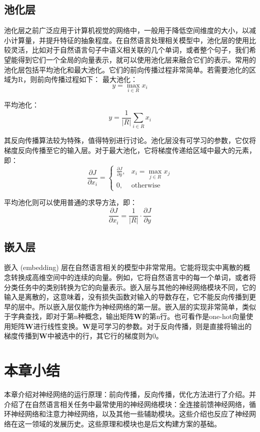 \subsection{池化层}

池化层之前广泛应用于计算机视觉的网络中，一般用于降低空间维度的大小，以减小计算量，并提升特征的抽象程度。在自然语言处理相关模型中，池化层的使用比较灵活，比如对于自然语言句子中语义相关联的几个单词，或者整个句子，我们希望能得到它们一个全局的向量表示，就可以使用池化层来融合它们的表示。常用的池化层包括平均池化和最大池化。它们的前向传播过程非常简单。若需要池化的区域为R，则前向传播过程如下：
最大池化：
\begin{equation}
    y=\max_{i\in R}{x_i}
\end{equation}

平均池化：
\begin{equation}
    y=\frac{1}{\left|R\right|}\sum_{i\in R}x_i
\end{equation}

其反向传播算法较为特殊，值得特别进行讨论。池化层没有可学习的参数，它仅将梯度反向传播至它的输入层。对于最大池化，它将梯度传递给区域中最大的元素，即：
\begin{equation}
    \frac{\partial J}{\partial x_i}=\begin{cases}
        \frac{\partial J}{\partial y}, & x_i=\max_{j\in R}{x_j}\\
        0, & \mathrm{otherwise}
    \end{cases}
\end{equation}

平均池化则可以使用普通的求导方法，即：
\begin{equation}
    \frac{\partial J}{\partial x_i}=\frac{1}{\left|R\right|}\cdot\frac{\partial J}{\partial y}
\end{equation}

\subsection{嵌入层}

嵌入 (embedding) 层在自然语言相关的模型中非常常用。它能将现实中离散的概念转换成高维空间中的连续的向量。例如，它将自然语言中的每一个单词，或者将分类任务中的类别转换为它的向量表示。嵌入层与其他的神经网络模块不同，它的输入是离散的，这意味着，没有损失函数对输入的导数存在，它不能反向传播到更早的层中。所以嵌入层仅能作为神经网络的第一层。嵌入层的实现非常简单，类似于字典查找，即对于第n种概念，输出矩阵$\bm{W}$的第n行。也可看作是one-hot向量使用矩阵$\bm{W}$进行线性变换。$\bm{W}$是可学习的参数。对于反向传播，则是直接将输出的梯度传播到$\bm{W}$中被选中的行，其它行的梯度则为0。

\section{本章小结}

本章介绍对神经网络的运行原理：前向传播，反向传播，优化方法进行了介绍。并介绍了在自然语言相关任务中最常使用的神经网络模块：全连接前馈神经网络，循环神经网络和注意力神经网络，以及其他一些辅助模块。这些介绍也反应了神经网络在这一领域的发展历史。这些原理和模块也是后文构建方案的基础。
